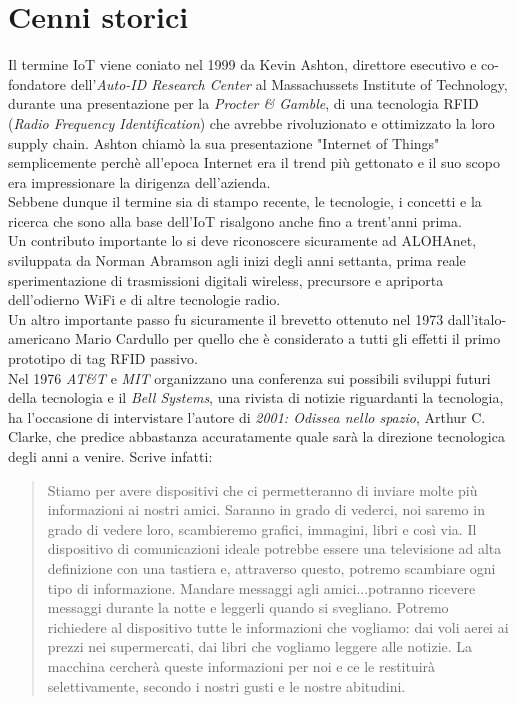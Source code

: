 \section{Cenni storici}
Il termine IoT viene coniato nel 1999 da Kevin Ashton, direttore esecutivo e co-fondatore dell'\textit{Auto-ID Research Center} al Massachussets Institute of Technology, durante una presentazione per la \textit{Procter \& Gamble}, di una tecnologia RFID (\textit{Radio Frequency Identification}) che avrebbe rivoluzionato e ottimizzato la loro supply chain. Ashton chiamò la sua presentazione "Internet of Things" semplicemente perchè all'epoca Internet era il trend più gettonato e il suo scopo era impressionare la dirigenza dell'azienda.
\\Sebbene dunque il termine sia di stampo recente, le tecnologie, i concetti e la ricerca che sono alla base dell'IoT risalgono anche fino a trent'anni prima.
\\Un contributo importante lo si deve riconoscere sicuramente ad ALOHAnet, sviluppata da Norman Abramson agli inizi degli anni settanta, prima reale sperimentazione di trasmissioni digitali wireless, precursore e apriporta dell'odierno WiFi e di altre tecnologie radio.
\\Un altro importante passo fu sicuramente il brevetto ottenuto nel 1973 dall'italo-americano Mario Cardullo per quello che è considerato a tutti gli effetti il primo prototipo di tag RFID passivo.
\\Nel 1976 \textit{AT\&T} e \textit{MIT} organizzano una conferenza sui possibili sviluppi futuri della tecnologia e il \textit{Bell Systems}, una rivista di notizie riguardanti la tecnologia, ha l'occasione di intervistare l'autore di \textit{2001: Odissea nello spazio}, Arthur C. Clarke, che predice abbastanza accuratamente quale sarà la direzione tecnologica degli anni a venire. Scrive infatti:
\begin{quotation}
Stiamo per avere dispositivi che ci permetteranno di inviare molte più informazioni ai nostri amici. Saranno in grado di vederci, noi saremo in grado di vedere loro, scambieremo grafici, immagini, libri e così via. Il dispositivo di comunicazioni ideale potrebbe essere una televisione ad alta definizione con una tastiera e, attraverso questo, potremo scambiare ogni tipo di informazione. Mandare messaggi agli amici...potranno ricevere messaggi durante la notte e leggerli quando si svegliano. Potremo richiedere al dispositivo tutte le informazioni che vogliamo: dai voli aerei ai prezzi nei supermercati, dai libri che vogliamo leggere alle notizie. La macchina cercherà queste informazioni per noi e ce le restituirà selettivamente, secondo i nostri gusti e le nostre abitudini.
\end{quotation}
